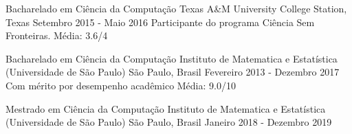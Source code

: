 \documentclass[11pt, a4paper]{awesome-cv-res}
\begin{document}
\makecvheader
\makecvfooter
  {}
  {}
  {\thepage}



\begin{cventries}
\cventry
{Bacharelado em Ciência da Computação}
{Texas A\&M University}
{College Station, Texas}
{Setembro 2015 - Maio 2016}
{Participante do programa Ciência Sem Fronteiras. \newline Média: 3.6/4}
\newline 
\newline

\cventry
{Bacharelado em Ciência da Computação} %
{Instituto de Matematica e Estatística (Universidade de São Paulo)} %
{São Paulo, Brasil} %
{Fevereiro 2013 - Dezembro 2017} %
{Com mérito por desempenho acadêmico \newline Média: 9.0/10}
\newline 
\newline

\cventry
{Mestrado em Ciência da Computação} %
{Instituto de Matematica e Estatística (Universidade de São Paulo)} %
{São Paulo, Brasil} %
{Janeiro 2018 - Dezembro 2019} %
{}
\end{cventries}
\end{document}
